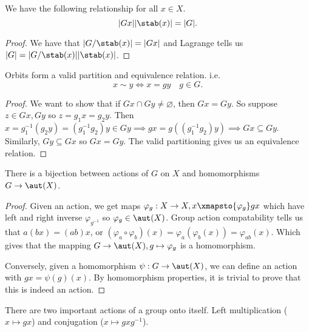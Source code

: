 \begin{cor}
We have the following relationship for all $x \in X$.
\[ \lvert Gx \rvert \lvert \stab(x) \rvert = \lvert G \rvert. \]
\end{cor}

\begin{proof}
We have that $\lvert G / \stab(x) \rvert = \lvert Gx \rvert$ and
Lagrange tells us $\lvert G \rvert = \lvert G / \stab(x) \rvert \lvert
\stab(x) \rvert$.
\end{proof}

\begin{prop}
Orbits form a valid partition and equivalence relation. i.e.
\[ x \sim y \iff x = gy \quad g \in G. \]
\end{prop}

\begin{proof}
We want to show that if $Gx \cap Gy \neq \varnothing$, then $Gx = Gy$.
So suppose $z \in Gx, Gy$ so $z = g_1 x = g_2 y$. Then $x = g_1^{-1}(g_2
y) = (g_1^{-1} g_2) y \in Gy \implies gx = g((g_1^{-1}g_2)y) \implies Gx
\subseteq Gy$. Similarly, $Gy \subseteq Gx$ so $Gx = Gy$. The valid
partitioning gives us an equivalence relation.
\end{proof}

\begin{prop}
\label{actionbijection}
There is a bijection between actions of $G$ on $X$ and homomorphisms $G
\to \aut(X)$.
\end{prop}

\begin{proof}
Given an action, we get maps $\varphi_g : X \to X, x \xmapsto{\varphi_g}
gx$ which have left and right inverse $\varphi_{g^{-1}}$ so $\varphi_g
\in \aut(X)$. Group action compatability tells us that $a(bx) = (ab)x$,
or $(\varphi_a \circ \varphi_b)(x) = \varphi_a(\varphi_b(x)) =
\varphi_{ab}(x)$. Which gives that the mapping $G \to \aut(X), g \mapsto
\varphi_g$ is a homomorphism.

Conversely, given a homomorphism $\psi : G \to \aut(X)$, we can define
an action with $gx = \psi(g)(x)$. By homomorphism properties, it is
trivial to prove that this is indeed an action.
\end{proof}

\begin{rem}
There are two important actions of a group onto itself. Left
multiplication ($x \mapsto gx$) and conjugation ($x \mapsto gxg^{-1}$).
\end{rem}

